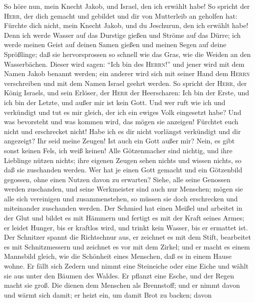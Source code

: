  So höre nun, mein Knecht Jakob, und Israel, den ich
erwählt habe!  So spricht der \textsc{Herr}, der dich
gemacht und gebildet und dir von Mutterleib an geholfen hat: Fürchte
dich nicht, mein Knecht Jakob, und du Jeschurun, den ich erwählt habe!
 Denn ich werde Wasser auf das Durstige gießen und Ströme
auf das Dürre; ich werde meinen Geist auf deinen Samen gießen und meinen
Segen auf deine Sprößlinge;  daß sie hervorsprossen so
schnell wie das Gras, wie die Weiden an den Wasserbächen. 
Dieser wird sagen: ``Ich bin des \textsc{Herrn}!'' und jener wird mit
dem Namen Jakob benannt werden; ein anderer wird sich mit seiner Hand
dem \textsc{Herrn} verschreiben und mit dem Namen Israel geehrt werden.
 So spricht der \textsc{Herr}, der König Israels, und sein
Erlöser, der \textsc{Herr} der Heerscharen: Ich bin der Erste, und ich
bin der Letzte, und außer mir ist kein Gott.  Und wer ruft
wie ich und verkündigt und tut es mir gleich, der ich ein ewiges Volk
eingesetzt habe? Und was bevorsteht und was kommen wird, das mögen sie
anzeigen!  Fürchtet euch nicht und erschrecket nicht! Habe
ich es dir nicht vorlängst verkündigt und dir angezeigt? Ihr seid meine
Zeugen! Ist auch ein Gott außer mir? Nein, es gibt sonst keinen Fels,
ich weiß keinen!  Alle Götzenmacher sind nichtig, und ihre
Lieblinge nützen nichts; ihre eigenen Zeugen sehen nichts und wissen
nichts, so daß sie zuschanden werden.  Wer hat je einen
Gott gemacht und ein Götzenbild gegossen, ohne einen Nutzen davon zu
erwarten?  Siehe, alle seine Genossen werden zuschanden,
und seine Werkmeister sind auch nur Menschen; mögen sie alle sich
vereinigen und zusammenstehen, so müssen sie doch erschrecken und
miteinander zuschanden werden.  Der Schmied hat einen
Meißel und arbeitet in der Glut und bildet es mit Hämmern und fertigt es
mit der Kraft seines Armes; er leidet Hunger, bis er kraftlos wird, und
trinkt kein Wasser, bis er ermattet ist.  Der Schnitzer
spannt die Richtschnur aus, er zeichnet es mit dem Stift, bearbeitet es
mit Schnitzmessern und zeichnet es vor mit dem Zirkel; und er macht es
einem Mannsbild gleich, wie die Schönheit eines Menschen, daß es in
einem Hause wohne.  Er fällt sich Zedern und nimmt eine
Steineiche oder eine Eiche und wählt sie aus unter den Bäumen des
Waldes. Er pflanzt eine Esche, und der Regen macht sie groß.
 Die dienen dem Menschen als Brennstoff; und er nimmt
davon und wärmt sich damit; er heizt ein, um damit Brot zu backen; davon
